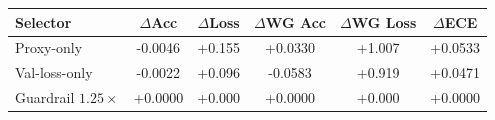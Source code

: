 \begin{tabular}{lccccc}
\toprule
Selector & $\Delta$Acc & $\Delta$Loss & $\Delta$WG Acc & $\Delta$WG Loss & $\Delta$ECE \\
\midrule
Proxy-only & -0.0046 & +0.155 & +0.0330 & +1.007 & +0.0533 \\
Val-loss-only & -0.0022 & +0.096 & -0.0583 & +0.919 & +0.0471 \\
Guardrail $1.25\times$ & +0.0000 & +0.000 & +0.0000 & +0.000 & +0.0000 \\
\bottomrule
\end{tabular}
